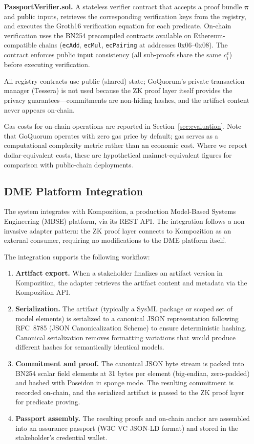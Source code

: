\textbf{PassportVerifier.sol.}
A stateless verifier contract that accepts a proof bundle $\boldsymbol{\pi}$ and public inputs, retrieves the corresponding verification keys from the registry, and executes the Groth16 verification equation for each predicate.
On-chain verification uses the BN254 precompiled contracts available on Ethereum-compatible chains (\texttt{ecAdd}, \texttt{ecMul}, \texttt{ecPairing} at addresses 0x06--0x08).
The contract enforces public input consistency (all sub-proofs share the same $c_i^{v}$) before executing verification.

All registry contracts use public (shared) state; GoQuorum's private transaction manager (Tessera) is not used because the ZK proof layer itself provides the privacy guarantees---commitments are non-hiding hashes, and the artifact content never appears on-chain.

Gas costs for on-chain operations are reported in Section~\ref{sec:evaluation}.
Note that GoQuorum operates with zero gas price by default; gas serves as a computational complexity metric rather than an economic cost.
Where we report dollar-equivalent costs, these are hypothetical mainnet-equivalent figures for comparison with public-chain deployments.

\subsection{DME Platform Integration}
\label{sec:arch-dme}

The system integrates with Kompozition, a production Model-Based Systems Engineering (MBSE) platform, via its REST API.
The integration follows a non-invasive adapter pattern: the ZK proof layer connects to Kompozition as an external consumer, requiring no modifications to the DME platform itself.

The integration supports the following workflow:
\begin{enumerate}
    \item \textbf{Artifact export.} When a stakeholder finalizes an artifact version in Kompozition, the adapter retrieves the artifact content and metadata via the Kompozition API.
    \item \textbf{Serialization.} The artifact (typically a SysML package or scoped set of model elements) is serialized to a canonical JSON representation following RFC~8785 (JSON Canonicalization Scheme) to ensure deterministic hashing. Canonical serialization removes formatting variations that would produce different hashes for semantically identical models.
    \item \textbf{Commitment and proof.} The canonical JSON byte stream is packed into BN254 scalar field elements at 31 bytes per element (big-endian, zero-padded) and hashed with Poseidon in sponge mode. The resulting commitment is recorded on-chain, and the serialized artifact is passed to the ZK proof layer for predicate proving.
    \item \textbf{Passport assembly.} The resulting proofs and on-chain anchor are assembled into an assurance passport (W3C VC JSON-LD format) and stored in the stakeholder's credential wallet.
\end{enumerate}

